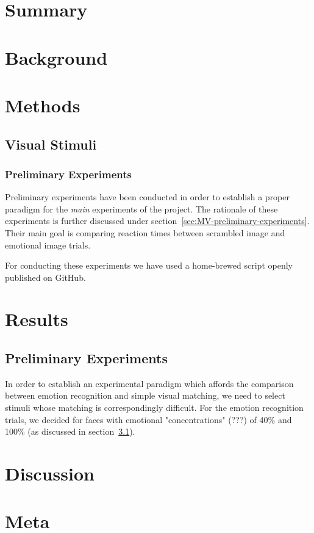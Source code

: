 
\chapter{Summary}
\chapter{Background}
\chapter{Methods}
    \section{Visual Stimuli}\label{sec:visual-stimuli}
	\subsection{Preliminary Experiments} 
	Preliminary experiments have been conducted in order to establish a proper paradigm for the \textit{main} experiments of the project. 
	The rationale of these experiments is further discussed under section~\ref{sec:MV-preliminary-experiments}. 
	Their main goal is comparing reaction times between scrambled image and emotional image trials.
	
	For conducting these experiments we have used a home-brewed script openly published on GitHub.
\chapter{Results}
	\section{Preliminary Experiments}
	In order to establish an experimental paradigm which affords the comparison between emotion recognition and simple visual matching, we need to select stimuli whose matching is correspondingly difficult.
	For the emotion recognition trials, we decided for faces with emotional "concentrations" (???) of 40\% and 100\% (as discussed in section~\ref{sec:visual-stimuli}).
\chapter{Discussion}
\chapter{Meta}


